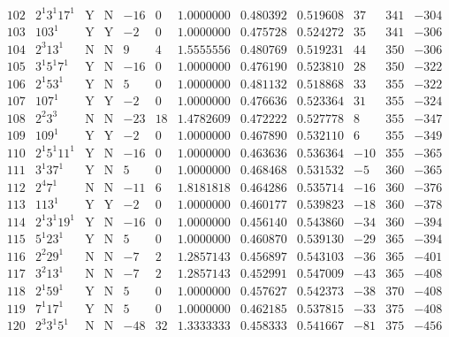 \documentclass[11pt,reqno,a4letter]{article}
\numberwithin{figure}{section}
\numberwithin{table}{section}
\theoremstyle{plain}
\numberwithin{theorem}{section}
\theoremstyle{definition}
\begin{document}
\begin{table}[ht]
\begin{equation*}
{\begin{array}{cc|cc|ccc|cc|ccc}
 102 & 2^1 3^1 17^1 & \text{Y} & \text{N} & -16 & 0 & 1.0000000 & 0.480392 & 0.519608 & 37 & 341 & -304 \\
 103 & 103^1 & \text{Y} & \text{Y} & -2 & 0 & 1.0000000 & 0.475728 & 0.524272 & 35 & 341 & -306 \\
 104 & 2^3 13^1 & \text{N} & \text{N} & 9 & 4 & 1.5555556 & 0.480769 & 0.519231 & 44 & 350 & -306 \\
 105 & 3^1 5^1 7^1 & \text{Y} & \text{N} & -16 & 0 & 1.0000000 & 0.476190 & 0.523810 & 28 & 350 & -322 \\
 106 & 2^1 53^1 & \text{Y} & \text{N} & 5 & 0 & 1.0000000 & 0.481132 & 0.518868 & 33 & 355 & -322 \\
 107 & 107^1 & \text{Y} & \text{Y} & -2 & 0 & 1.0000000 & 0.476636 & 0.523364 & 31 & 355 & -324 \\
 108 & 2^2 3^3 & \text{N} & \text{N} & -23 & 18 & 1.4782609 & 0.472222 & 0.527778 & 8 & 355 & -347 \\
 109 & 109^1 & \text{Y} & \text{Y} & -2 & 0 & 1.0000000 & 0.467890 & 0.532110 & 6 & 355 & -349 \\
 110 & 2^1 5^1 11^1 & \text{Y} & \text{N} & -16 & 0 & 1.0000000 & 0.463636 & 0.536364 & -10 & 355 & -365 \\
 111 & 3^1 37^1 & \text{Y} & \text{N} & 5 & 0 & 1.0000000 & 0.468468 & 0.531532 & -5 & 360 & -365 \\
 112 & 2^4 7^1 & \text{N} & \text{N} & -11 & 6 & 1.8181818 & 0.464286 & 0.535714 & -16 & 360 & -376 \\
 113 & 113^1 & \text{Y} & \text{Y} & -2 & 0 & 1.0000000 & 0.460177 & 0.539823 & -18 & 360 & -378 \\
 114 & 2^1 3^1 19^1 & \text{Y} & \text{N} & -16 & 0 & 1.0000000 & 0.456140 & 0.543860 & -34 & 360 & -394 \\
 115 & 5^1 23^1 & \text{Y} & \text{N} & 5 & 0 & 1.0000000 & 0.460870 & 0.539130 & -29 & 365 & -394 \\
 116 & 2^2 29^1 & \text{N} & \text{N} & -7 & 2 & 1.2857143 & 0.456897 & 0.543103 & -36 & 365 & -401 \\
 117 & 3^2 13^1 & \text{N} & \text{N} & -7 & 2 & 1.2857143 & 0.452991 & 0.547009 & -43 & 365 & -408 \\
 118 & 2^1 59^1 & \text{Y} & \text{N} & 5 & 0 & 1.0000000 & 0.457627 & 0.542373 & -38 & 370 & -408 \\
 119 & 7^1 17^1 & \text{Y} & \text{N} & 5 & 0 & 1.0000000 & 0.462185 & 0.537815 & -33 & 375 & -408 \\
 120 & 2^3 3^1 5^1 & \text{N} & \text{N} & -48 & 32 & 1.3333333 & 0.458333 & 0.541667 & -81 & 375 & -456 \\

\end{array}}
\end{equation*}
\end{table}
\end{document}
